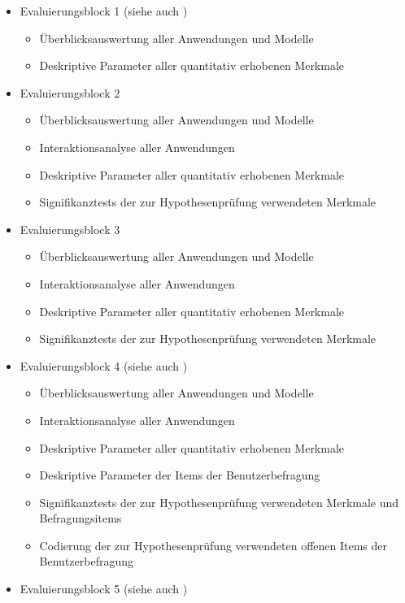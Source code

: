 \begin{itemize}
	\item Evaluierungsblock 1 (siehe auch \citep{Bohninger10})
		\begin{itemize}
			\item Überblicksauswertung aller Anwendungen und Modelle
			\item Deskriptive Parameter aller quantitativ erhobenen Merkmale
		\end{itemize}
	\item Evaluierungsblock 2
		\begin{itemize}
			\item Überblicksauswertung aller Anwendungen und Modelle
			\item Interaktionsanalyse aller Anwendungen
			\item Deskriptive Parameter aller quantitativ erhobenen Merkmale
			\item Signifikanztests der zur Hypothesenprüfung verwendeten Merkmale
		\end{itemize}
	\item Evaluierungsblock 3
		\begin{itemize}
			\item Überblicksauswertung aller Anwendungen und Modelle
			\item Interaktionsanalyse aller Anwendungen
			\item Deskriptive Parameter aller quantitativ erhobenen Merkmale
			\item Signifikanztests der zur Hypothesenprüfung verwendeten Merkmale
		\end{itemize}
	\item Evaluierungsblock 4 (siehe auch \citep{Wahlmuller10})
		\begin{itemize}
			\item Überblicksauswertung aller Anwendungen und Modelle
			\item Interaktionsanalyse aller Anwendungen
			\item Deskriptive Parameter aller quantitativ erhobenen Merkmale
			\item Deskriptive Parameter der Items der Benutzerbefragung
			\item Signifikanztests der zur Hypothesenprüfung verwendeten Merkmale und Befragungsitems
			\item Codierung der zur Hypothesenprüfung verwendeten offenen Items der Benutzerbefragung
		\end{itemize}
	\item Evaluierungsblock 5 (siehe auch \citep{Bindreiter10})

\end{itemize}
